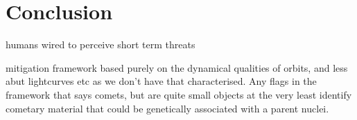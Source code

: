 \chapter{Conclusion}
\label{chap:conclusion}

\lipsum[100]


humans wired to perceive short term threats

mitigation framework based purely on the dynamical qualities of orbits, and less abut lightcurves etc as we don't have that characterised. Any flags in the framework that says comets, but are quite small objects at the very least identify cometary material that could be genetically associated with a parent nuclei.